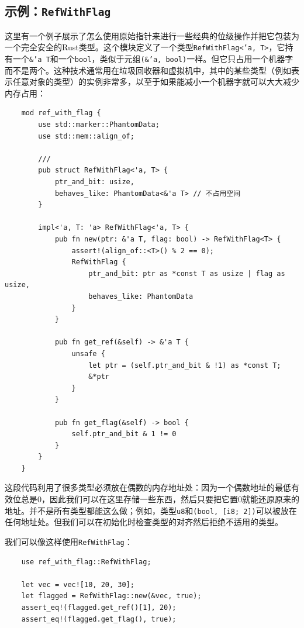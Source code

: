 \subsection{示例：\texttt{RefWithFlag}}\label{RefWithFlag}
这里有一个例子展示了怎么使用原始指针来进行一些经典的位级操作并把它包装为一个完全安全的Rust类型。这个模块定义了一个类型\texttt{RefWithFlag<'a, T>}，它持有一个\texttt{\&'a T}和一个\texttt{bool}，类似于元组\texttt{(\&'a, bool)}一样。但它只占用一个机器字而不是两个。这种技术通常用在垃圾回收器和虚拟机中，其中的某些类型（例如表示任意对象的类型）的实例非常多，以至于如果能减小一个机器字就可以大大减少内存占用：
\begin{verbatim}
    mod ref_with_flag {
        use std::marker::PhantomData;
        use std::mem::align_of;

        ///
        pub struct RefWithFlag<'a, T> {
            ptr_and_bit: usize,
            behaves_like: PhantomData<&'a T> // 不占用空间
        }

        impl<'a, T: 'a> RefWithFlag<'a, T> {
            pub fn new(ptr: &'a T, flag: bool) -> RefWithFlag<T> {
                assert!(align_of::<T>() % 2 == 0);
                RefWithFlag {
                    ptr_and_bit: ptr as *const T as usize | flag as usize,
                    behaves_like: PhantomData
                }
            }

            pub fn get_ref(&self) -> &'a T {
                unsafe {
                    let ptr = (self.ptr_and_bit & !1) as *const T;
                    &*ptr
                }
            }

            pub fn get_flag(&self) -> bool {
                self.ptr_and_bit & 1 != 0
            }
        }
    }
\end{verbatim}

这段代码利用了很多类型必须放在偶数的内存地址处：因为一个偶数地址的最低有效位总是0，因此我们可以在这里存储一些东西，然后只要把它置0就能还原原来的地址。并不是所有类型都能这么做；例如，类型\texttt{u8}和\texttt{(bool, [i8; 2])}可以被放在任何地址处。但我们可以在初始化时检查类型的对齐然后拒绝不适用的类型。

我们可以像这样使用\texttt{RefWithFlag}：
\begin{verbatim}
    use ref_with_flag::RefWithFlag;

    let vec = vec![10, 20, 30];
    let flagged = RefWithFlag::new(&vec, true);
    assert_eq!(flagged.get_ref()[1], 20);
    assert_eq!(flagged.get_flag(), true);
\end{verbatim}

